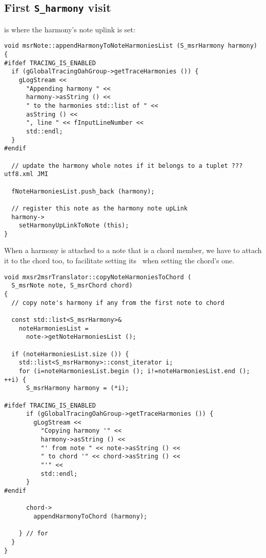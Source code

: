 \subsection{First {\tt S_harmony} visit}

 is where the harmony's note uplink is set:
\begin{lstlisting}[language=CPlusPlus]
void msrNote::appendHarmonyToNoteHarmoniesList (S_msrHarmony harmony)
{
#ifdef TRACING_IS_ENABLED
  if (gGlobalTracingOahGroup->getTraceHarmonies ()) {
    gLogStream <<
      "Appending harmony " <<
      harmony->asString () <<
      " to the harmonies std::list of " <<
      asString () <<
      ", line " << fInputLineNumber <<
      std::endl;
  }
#endif

  // update the harmony whole notes if it belongs to a tuplet ??? utf8.xml JMI

  fNoteHarmoniesList.push_back (harmony);

  // register this note as the harmony note upLink
  harmony->
    setHarmonyUpLinkToNote (this);
}
\end{lstlisting}

When a harmony is attached to a note that is a chord member, we have to attach it to the chord too, to facilitate setting its \pim\ when setting the chord's one.
\begin{lstlisting}[language=CPlusPlus]
void mxsr2msrTranslator::copyNoteHarmoniesToChord (
  S_msrNote note, S_msrChord chord)
{
  // copy note's harmony if any from the first note to chord

  const std::list<S_msrHarmony>&
    noteHarmoniesList =
      note->getNoteHarmoniesList ();

  if (noteHarmoniesList.size ()) {
    std::list<S_msrHarmony>::const_iterator i;
    for (i=noteHarmoniesList.begin (); i!=noteHarmoniesList.end (); ++i) {
      S_msrHarmony harmony = (*i);

#ifdef TRACING_IS_ENABLED
      if (gGlobalTracingOahGroup->getTraceHarmonies ()) {
        gLogStream <<
          "Copying harmony '" <<
          harmony->asString () <<
          "' from note " << note->asString () <<
          " to chord '" << chord->asString () <<
          "'" <<
          std::endl;
      }
#endif

      chord->
        appendHarmonyToChord (harmony);

    } // for
  }
}
\end{lstlisting}


